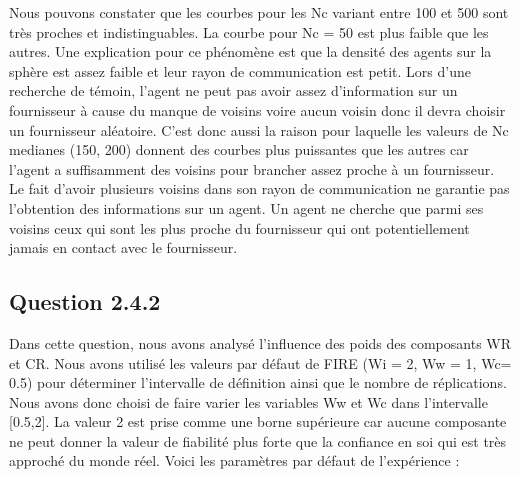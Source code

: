Nous pouvons constater que les courbes pour les Nc variant entre 100 et 500 sont très proches et indistinguables. La courbe pour Nc = 50 est plus faible que les autres. Une explication pour ce phénomène est que la densité des agents sur la sphère est assez faible et leur rayon de communication est petit. Lors d'une recherche de témoin, l'agent ne peut pas avoir assez d'information sur un fournisseur à cause du manque de voisins voire aucun voisin donc il devra choisir un fournisseur aléatoire. C'est donc aussi la raison pour laquelle les valeurs de Nc medianes (150, 200) donnent des courbes plus puissantes que les autres car l'agent a suffisamment des voisins pour brancher assez proche à un fournisseur. Le fait d'avoir plusieurs voisins dans son rayon de communication ne garantie pas l'obtention des informations sur un agent. Un agent ne cherche que parmi ses voisins ceux qui sont les plus proche du fournisseur qui ont potentiellement jamais en contact avec le fournisseur.

\subsection{Question 2.4.2}
Dans cette question, nous avons analysé l'influence des poids des composants WR et CR. Nous avons utilisé les valeurs par défaut de FIRE \cite{firemodel} (Wi = 2, Ww = 1, Wc= 0.5) pour déterminer l'intervalle de définition ainsi que le nombre de réplications. Nous avons donc choisi de faire varier les variables Ww et Wc dans l'intervalle [0.5,2]. La valeur 2 est prise comme une borne supérieure car aucune composante ne peut donner la valeur de fiabilité plus forte que la confiance en soi qui est très approché du monde réel. Voici les paramètres par défaut de l'expérience :

